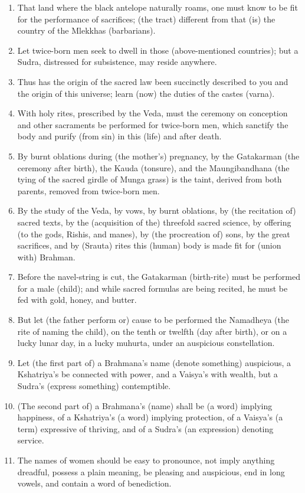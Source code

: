 \begin{enumerate}
\item That land where the black antelope naturally roams, one must know to be fit for the performance of sacrifices; (the tract) different from that (is) the country of the Mlekkhas (barbarians).
\item Let twice-born men seek to dwell in those (above-mentioned countries); but a Sudra, distressed for subsistence, may reside anywhere.
\item Thus has the origin of the sacred law been succinctly described to you and the origin of this universe; learn (now) the duties of the castes (varna).
\item With holy rites, prescribed by the Veda, must the ceremony on conception and other sacraments be performed for twice-born men, which sanctify the body and purify (from sin) in this (life) and after death.
\item By burnt oblations during (the mother's) pregnancy, by the Gatakarman (the ceremony after birth), the Kauda (tonsure), and the Maungibandhana (the tying of the sacred girdle of Munga grass) is the taint, derived from both parents, removed from twice-born men.
\item By the study of the Veda, by vows, by burnt oblations, by (the recitation of) sacred texts, by the (acquisition of the) threefold sacred science, by offering (to the gods, Rishis, and manes), by (the procreation of) sons, by the great sacrifices, and by (Srauta) rites this (human) body is made fit for (union with) Brahman.
\item Before the navel-string is cut, the Gatakarman (birth-rite) must be performed for a male (child); and while sacred formulas are being recited, he must be fed with gold, honey, and butter.
\item But let (the father perform or) cause to be performed the Namadheya (the rite of naming the child), on the tenth or twelfth (day after birth), or on a lucky lunar day, in a lucky muhurta, under an auspicious constellation.
\item Let (the first part of) a Brahmana's name (denote something) auspicious, a Kshatriya's be connected with power, and a Vaisya's with wealth, but a Sudra's (express something) contemptible.
\item (The second part of) a Brahmana's (name) shall be (a word) implying happiness, of a Kshatriya's (a word) implying protection, of a Vaisya's (a term) expressive of thriving, and of a Sudra's (an expression) denoting service.
\item The names of women should be easy to pronounce, not imply anything dreadful, possess a plain meaning, be pleasing and auspicious, end in long vowels, and contain a word of benediction.

\end{enumerate}
